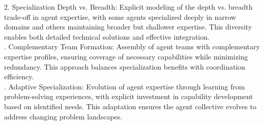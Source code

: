 2. Specialization Depth vs. Breadth: Explicit modeling of the depth vs. breadth trade-off in agent expertise, with some agents specialized deeply in narrow domains and others maintaining broader but shallower expertise. This diversity enables both detailed technical solutions and effective integration.\\ . Complementary Team Formation: Assembly of agent teams with complementary expertise profiles, ensuring coverage of necessary capabilities while minimizing redundancy. This approach balances specialization benefits with coordination efficiency.\\ . Adaptive Specialization: Evolution of agent expertise through learning from problem-solving experiences, with explicit investment in capability development based on identified needs. This adaptation ensures the agent collective evolves to address changing problem landscapes.\\
